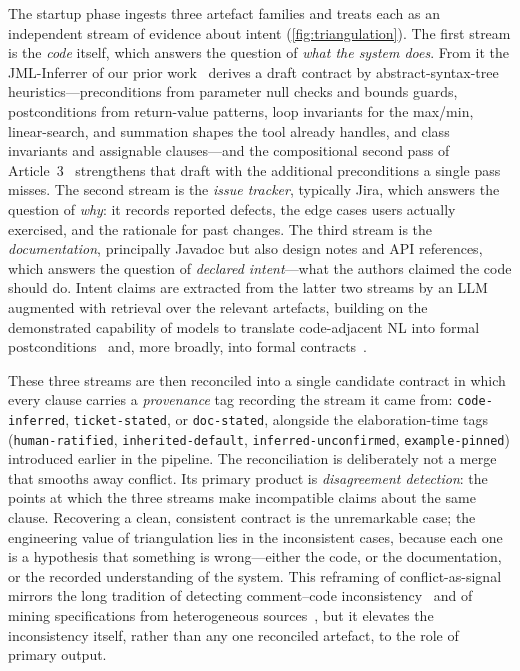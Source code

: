 The startup phase ingests three artefact families and treats each as an independent stream of evidence about intent (\cref{fig:triangulation}). The first stream is the \emph{code} itself, which answers the question of \emph{what the system does}. From it the JML-Inferrer of our prior work~\cite{edmonds_article1,edmonds_article3} derives a draft contract by abstract-syntax-tree heuristics---preconditions from parameter null checks and bounds guards, postconditions from return-value patterns, loop invariants for the max/min, linear-search, and summation shapes the tool already handles, and class invariants and assignable clauses---and the compositional second pass of Article~3~\cite{edmonds_article3} strengthens that draft with the additional preconditions a single pass misses. The second stream is the \emph{issue tracker}, typically Jira, which answers the question of \emph{why}: it records reported defects, the edge cases users actually exercised, and the rationale for past changes. The third stream is the \emph{documentation}, principally Javadoc but also design notes and API references, which answers the question of \emph{declared intent}---what the authors claimed the code should do. Intent claims are extracted from the latter two streams by an LLM augmented with retrieval over the relevant artefacts, building on the demonstrated capability of models to translate code-adjacent NL into formal postconditions~\cite{endres2024nl2postcond,ma2025specgen} and, more broadly, into formal contracts~\cite{lahiri2025nl2contract,cosler2023nl2spec}.

These three streams are then reconciled into a single candidate contract in which every clause carries a \emph{provenance} tag recording the stream it came from: \texttt{code-inferred}, \texttt{ticket-stated}, or \texttt{doc-stated}, alongside the elaboration-time tags (\texttt{human-ratified}, \texttt{inherited-default}, \texttt{inferred-unconfirmed}, \texttt{example-pinned}) introduced earlier in the pipeline. The reconciliation is deliberately not a merge that smooths away conflict. Its primary product is \emph{disagreement detection}: the points at which the three streams make incompatible claims about the same clause. Recovering a clean, consistent contract is the unremarkable case; the engineering value of triangulation lies in the inconsistent cases, because each one is a hypothesis that something is wrong---either the code, or the documentation, or the recorded understanding of the system. This reframing of conflict-as-signal mirrors the long tradition of detecting comment--code inconsistency~\cite{tan2012tcomment,wen2019codecomment} and of mining specifications from heterogeneous sources~\cite{ammons2002mining,ernst2007daikon}, but it elevates the inconsistency itself, rather than any one reconciled artefact, to the role of primary output.

